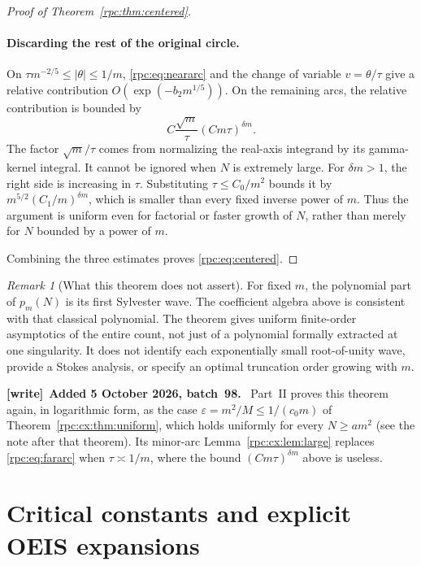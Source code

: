 \documentclass[11pt]{article}
\theoremstyle{definition}
\theoremstyle{remark}
\newtheorem{remark}[theorem]{Remark}
\numberwithin{equation}{section}
\newenvironment{writenote}[1][]{\par\smallskip\begingroup\small
 \noindent\textbf{[write]}\if\relax\detokenize{#1}\relax\else~\textbf{#1.}\fi\ }%
 {\par\endgroup\smallskip}
\begin{document}
\begin{proof}[Proof of Theorem~\ref{rpc:thm:centered}]
\paragraph{Discarding the rest of the original circle.}
On $\tau m^{-2/5}\le|\theta|\le1/m$, \eqref{rpc:eq:neararc} and the change
of variable $v=\theta/\tau$ give a relative contribution
$O(\exp(-b_2m^{1/5}))$. On the remaining arcs, the relative contribution is
bounded by
\begin{equation}\label{rpc:eq:far-prefactor}
 C\frac{\sqrt m}{\tau}(Cm\tau)^{\delta m}.
\end{equation}
The factor $\sqrt m/\tau$ comes from normalizing the real-axis integrand by
its gamma-kernel integral. It cannot be ignored when $N$ is extremely large.
For $\delta m>1$, the right side is increasing in $\tau$. Substituting
$\tau\le C_0/m^2$ bounds it by
$m^{5/2}(C_1/m)^{\delta m}$, which is smaller than every fixed inverse power
of $m$. Thus the argument is uniform even for factorial or faster growth of
$N$, rather than merely for $N$ bounded by a power of $m$.

Combining the three estimates proves \eqref{rpc:eq:centered}.
\end{proof}

\begin{remark}[What this theorem does not assert]
For fixed $m$, the polynomial part of $p_m(N)$ is its first Sylvester wave.
The coefficient algebra above is consistent with that classical polynomial.
The theorem gives uniform finite-order asymptotics of the entire count, not
just of a polynomial formally extracted at one singularity. It does not
identify each exponentially small root-of-unity wave, provide a Stokes
analysis, or specify an optimal truncation order growing with $m$.
\end{remark}

\begin{writenote}[Added 5 October 2026, batch~98]
Part~II proves this theorem again, in logarithmic form, as the case
$\varepsilon=m^2/M\le1/(c_0m)$ of Theorem~\ref{rpc:cx:thm:uniform}, which
holds uniformly for every $N\ge am^2$
(see the note after that theorem). Its minor-arc
Lemma~\ref{rpc:cx:lem:large} replaces \eqref{rpc:eq:fararc} when
$\tau\asymp1/m$, where the bound $(Cm\tau)^{\delta m}$ above is useless.
\end{writenote}

\section{Critical constants and explicit OEIS expansions}\label{rpc:sec:critical}
\end{document}
